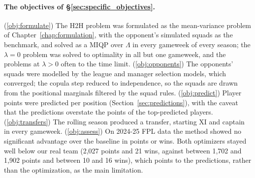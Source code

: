 \documentclass[12pt,oneside,a4paper]{book}
\theoremstyle{definition}
\theoremstyle{remark}
\begin{document}
	\paragraph{The objectives of \S\ref{sec:specific_objectives}.} (\ref{obj:formulate}) The H2H problem was formulated as the mean-variance
	problem of Chapter~\ref{chap:formulation}, with the opponent's simulated squads as the benchmark, and solved as a
	MIQP over $\Lambda$ in every gameweek of every season; the $\lambda=0$ problem was solved to
	optimality in all but one gameweek, and the problems at $\lambda>0$ often to the time limit.
	(\ref{obj:opponents}) The opponents' squads were modelled by the league and manager selection
	models, which converged; the copula step reduced to independence, so the squads are drawn from
	the positional marginals filtered by the squad rules. (\ref{obj:predict}) Player points were
	predicted per position (Section~\ref{sec:predictions}), with the caveat that the predictions
	overstate the points of the top-predicted players. (\ref{obj:transfers}) The rolling season produced a transfer, starting
	XI and captain in every gameweek. (\ref{obj:assess}) On 2024-25 FPL data the method showed no significant
	advantage over the baseline in points or wins. Both optimizers stayed well below our real
	team (2{,}027 points and 21 wins, against between 1{,}702 and 1{,}902 points and between 10 and
	16 wins), which points to the predictions, rather than the optimization, as the main
	limitation.
\end{document}
